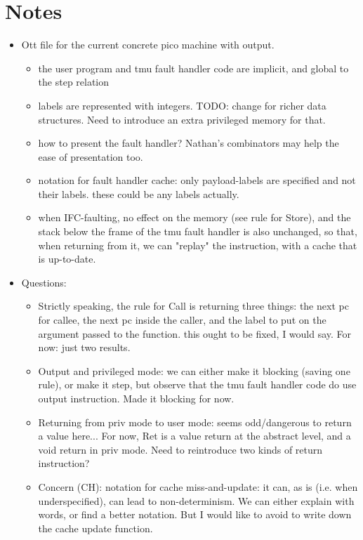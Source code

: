 \documentclass{article}
\begin{document}
\section*{Notes}

\begin{itemize}
\item Ott file for the current concrete pico machine with output.
  \begin{itemize}
    \item the user program and tmu fault handler code are implicit,
      and global to the step relation
    \item labels are represented with integers. TODO: change for
      richer data structures. Need to introduce an extra privileged
      memory for that.
    \item how to present the fault handler? Nathan's
      combinators may help the ease of presentation too.
    \item notation for fault handler cache: only payload-labels are
      specified and not their labels. these could be any labels actually.
    \item when IFC-faulting, no effect on the memory (see rule for
      Store), and the stack below the frame of the tmu fault handler
      is also unchanged, so that, when returning from it, we can
      "replay" the instruction, with a cache that is up-to-date.
  \end{itemize}
\item Questions:
  \begin{itemize}
    \item Strictly speaking, the rule for Call is returning three
      things: the next pc for callee, the next pc inside the caller,
      and the label to put on the argument passed to the function.
      this ought to be fixed, I would say. For now: just two results.
    \item Output and privileged mode: we can either make it blocking
      (saving one rule), or make it step, but observe that the tmu
      fault handler code do use output instruction. Made it blocking
      for now.
    \item Returning from priv mode to user mode: seems odd/dangerous
      to return a value here... For now, Ret is a value return at the
      abstract level, and a void return in priv mode. Need to
      reintroduce two kinds of return instruction?
    \item Concern (CH): notation for cache miss-and-update: it can, as
      is (i.e. when underspecified), can lead to non-determinism.  We
      can either explain with words, or find a better notation. But I
      would like to avoid to write down the cache update function.
  \end{itemize}
\end{itemize}
\end{document}
